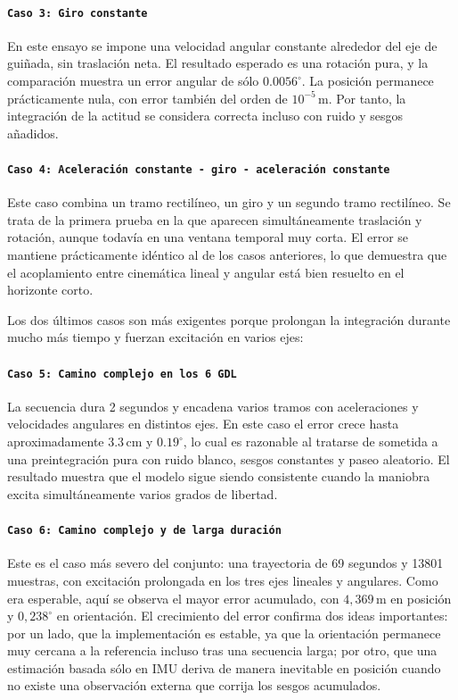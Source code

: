 \paragraph{\texttt{Caso 3: Giro constante}}
En este ensayo se impone una velocidad angular constante alrededor del eje de gui\~nada, sin traslaci\'on neta. El 
resultado esperado es una rotaci\'on pura, y la comparaci\'on muestra un error angular de s\'olo $0.0056^\circ$. 
La posici\'on permanece pr\'acticamente nula, con error tambi\'en del orden de $10^{-5}\,\mathrm{m}$. Por tanto, 
la integraci\'on de la actitud se considera correcta incluso con ruido y sesgos a\~nadidos.

\paragraph{\texttt{Caso 4: Aceleraci\'on constante - giro - aceleraci\'on constante}}
Este caso combina un tramo rectil\'ineo, un giro y un segundo tramo rectil\'ineo. Se trata de la primera prueba en la que 
aparecen simult\'aneamente traslaci\'on y rotaci\'on, aunque todav\'ia en una ventana temporal muy corta. El error se 
mantiene pr\'acticamente id\'entico al de los casos anteriores, lo que demuestra que el acoplamiento entre cinem\'atica 
lineal y angular est\'a bien resuelto en el horizonte corto.

Los dos \'ultimos casos son m\'as exigentes porque prolongan la integraci\'on durante mucho m\'as tiempo y fuerzan 
excitaci\'on en varios ejes:

\paragraph{\texttt{Caso 5: Camino complejo en los 6 GDL}}
La secuencia dura 2 segundos y encadena varios tramos con aceleraciones y velocidades angulares en distintos ejes. 
En este caso el error crece hasta aproximadamente $3.3\,\mathrm{cm}$ y $0.19^\circ$, lo cual es razonable al tratarse de 
sometida a una preintegraci\'on pura con ruido blanco, sesgos constantes y paseo aleatorio. El resultado muestra que el modelo 
sigue siendo consistente cuando la maniobra excita simult\'aneamente varios grados de libertad.

\paragraph{\texttt{Caso 6: Camino complejo y de larga duración}}
Este es el caso m\'as severo del conjunto: una trayectoria de 69 segundos y 13801 muestras, con excitaci\'on prolongada 
en los tres ejes lineales y angulares. Como era esperable, aqu\'i se observa el mayor error acumulado, 
con $4,369\,\mathrm{m}$ en posici\'on y $0,238^\circ$ en orientaci\'on. El crecimiento del error confirma dos ideas 
importantes: por un lado, que la implementaci\'on es estable, ya que la orientaci\'on permanece muy cercana a la 
referencia incluso tras una secuencia larga; por otro, que una estimaci\'on basada s\'olo en IMU deriva de manera 
inevitable en posici\'on cuando no existe una observaci\'on externa que corrija los sesgos acumulados.


